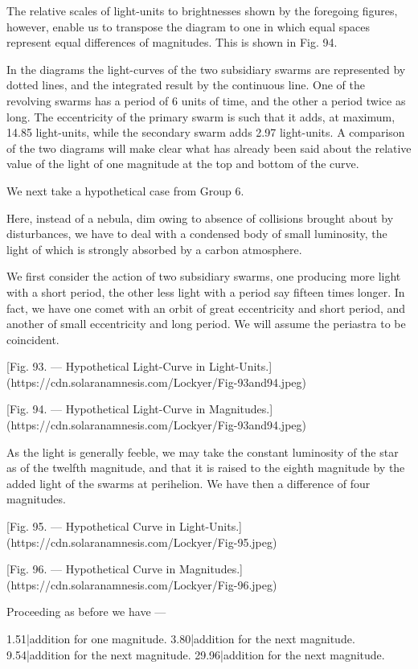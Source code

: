 \documentclass[a4paper, 12pt, oneside, polutonikogreek, english]{article}
\begin{document}
The relative scales of light-units to brightnesses shown by the foregoing figures, however, enable us to transpose the diagram to one in which equal spaces represent equal differences of magnitudes. This is shown in Fig. 94.

In the diagrams the light-curves of the two subsidiary swarms are represented by dotted lines, and the integrated result by the continuous line. One of the revolving swarms has a period of 6 units of time, and the other a period twice as long. The eccentricity of the primary swarm is such that it adds, at maximum, 14.85 light-units, while the secondary swarm adds 2.97 light-units. A comparison of the two diagrams will make clear what has already been said about the relative value of the light of one magnitude at the top and bottom of the curve.

We next take a hypothetical case from Group 6.

Here, instead of a nebula, dim owing to absence of collisions brought about by disturbances, we have to deal with a condensed body of small luminosity, the light of which is strongly absorbed by a carbon atmosphere.

We first consider the action of two subsidiary swarms, one producing more light with a short period, the other less light with a period say fifteen times longer. In fact, we have one comet with an orbit of great eccentricity and short period, and another of small eccentricity and long period. We will assume the periastra to be coincident.

[Fig. 93. --- Hypothetical Light-Curve in Light-Units.](https://cdn.solaranamnesis.com/Lockyer/Fig-93and94.jpeg)

[Fig. 94. --- Hypothetical Light-Curve in Magnitudes.](https://cdn.solaranamnesis.com/Lockyer/Fig-93and94.jpeg)

As the light is generally feeble, we may take the constant luminosity of the star as of the twelfth magnitude, and that it is raised to the eighth magnitude by the added light of the swarms at perihelion. We have then a difference of four magnitudes.

[Fig. 95. --- Hypothetical Curve in Light-Units.](https://cdn.solaranamnesis.com/Lockyer/Fig-95.jpeg)

[Fig. 96. --- Hypothetical Curve in Magnitudes.](https://cdn.solaranamnesis.com/Lockyer/Fig-96.jpeg)

Proceeding as before we have ---

1.51|addition for one magnitude. 
3.80|addition for the next magnitude. 
9.54|addition for the next magnitude. 
29.96|addition for the next magnitude. 
\end{document}
